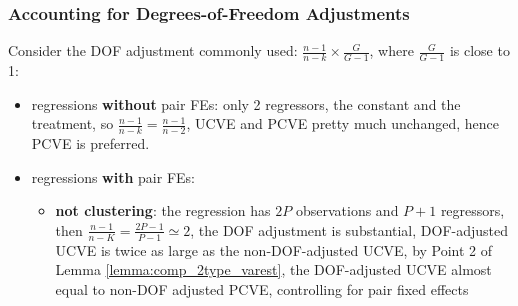 \documentclass[twoside]{article}
\begin{document}
\subsubsection{Accounting for Degrees-of-Freedom Adjustments}
Consider the DOF adjustment commonly used: $\frac{n-1}{n-k}\times \frac{G}{G-1}$, where $\frac{G}{G-1}$ is close to 1:
\begin{itemize}
    \item regressions \textbf{without} pair FEs: only 2 regressors, the constant and the treatment, so $\frac{n-1}{n-k}=\frac{n-1}{n-2}$, UCVE and PCVE pretty much unchanged, hence PCVE is preferred.
    \item regressions \textbf{with} pair FEs: 
    \begin{itemize}
        \item \textbf{not clustering}: the regression has $2P$ observations and $P+1$ regressors, then $\frac{n-1}{n-K}=\frac{2P-1}{P-1}\simeq 2$, the DOF adjustment is substantial, DOF-adjusted UCVE is twice as large as the non-DOF-adjusted UCVE, by Point 2 of Lemma \ref{lemma:comp_2type_varest}, the DOF-adjusted UCVE almost equal to non-DOF adjusted PCVE, controlling for pair fixed effects
    \end{itemize}
\end{itemize}

\newpage


\end{document}
